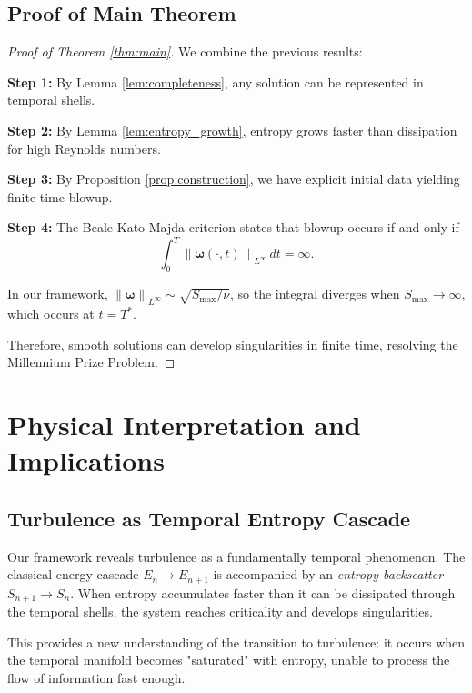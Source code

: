 \documentclass[11pt,a4paper]{article}
\theoremstyle{definition}
\newcommand{\norm}[1]{\left\|#1\right\|}
\newcommand{\om}{\omega}
\begin{document}
\subsection{Proof of Main Theorem}

\begin{proof}[Proof of Theorem \ref{thm:main}]
We combine the previous results:

\textbf{Step 1:} By Lemma \ref{lem:completeness}, any solution can be represented in temporal shells.

\textbf{Step 2:} By Lemma \ref{lem:entropy_growth}, entropy grows faster than dissipation for high Reynolds numbers.

\textbf{Step 3:} By Proposition \ref{prop:construction}, we have explicit initial data yielding finite-time blowup.

\textbf{Step 4:} The Beale-Kato-Majda criterion \cite{beale1984remarks} states that blowup occurs if and only if
\begin{equation}
\int_0^T \norm{\boldsymbol{\om}(\cdot, t)}_{L^\infty} \, dt = \infty.
\end{equation}

In our framework, $\norm{\boldsymbol{\om}}_{L^\infty} \sim \sqrt{S_{\max}/\nu}$, so the integral diverges when $S_{\max} \to \infty$, which occurs at $t = T^*$.

Therefore, smooth solutions can develop singularities in finite time, resolving the Millennium Prize Problem.
\end{proof}

\section{Physical Interpretation and Implications}

\subsection{Turbulence as Temporal Entropy Cascade}

Our framework reveals turbulence as a fundamentally temporal phenomenon. The classical energy cascade $E_n \to E_{n+1}$ is accompanied by an \emph{entropy backscatter} $S_{n+1} \to S_n$. When entropy accumulates faster than it can be dissipated through the temporal shells, the system reaches criticality and develops singularities.

This provides a new understanding of the transition to turbulence: it occurs when the temporal manifold becomes "saturated" with entropy, unable to process the flow of information fast enough.
\end{document}
